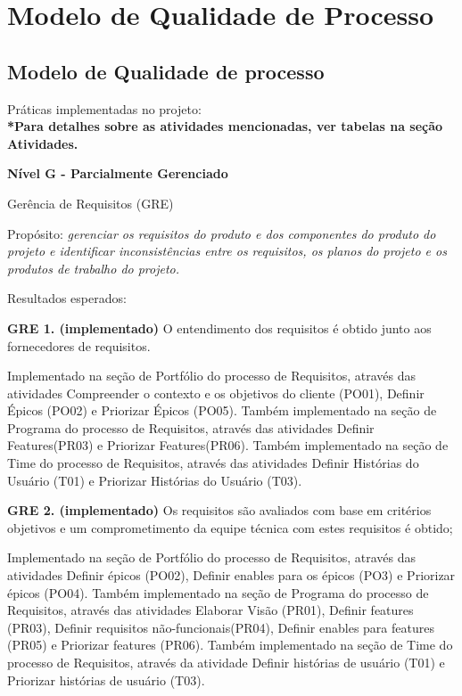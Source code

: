 \chapter[Modelo de Qualidade de Processo]{Modelo de Qualidade de Processo}
{\large {\section { Modelo de Qualidade de processo \\ } } }
{\large Práticas implementadas no projeto:\\}
{\footnotesize {\textbf { *Para detalhes sobre as atividades mencionadas, ver tabelas na seção Atividades. \\ }}}

\begin {enumerate}
{\item {\large \textbf{Nível G - Parcialmente Gerenciado \\}}}

\begin  {itemize}
{\item {Gerência de Requisitos (GRE)}}

{\tab Propósito: \textit{gerenciar os requisitos do produto e dos componentes do produto do projeto e identificar inconsistências entre os requisitos, os planos do projeto e os produtos de trabalho do projeto.\\}}

{Resultados esperados:\\}

{\item \textbf{GRE 1. (implementado)} O entendimento dos requisitos é obtido junto aos fornecedores de requisitos.}

Implementado na seção de Portfólio do processo de Requisitos, através das atividades Compreender o contexto e os objetivos do cliente (PO01), Definir Épicos (PO02) e Priorizar Épicos (PO05).
Também implementado na seção de Programa do processo de Requisitos, através das atividades Definir Features(PR03) e Priorizar Features(PR06).
Também implementado na seção de Time do processo de Requisitos, através das atividades Definir Histórias do Usuário (T01) e Priorizar Histórias do Usuário (T03).


{\item \textbf{GRE 2. (implementado)} Os requisitos são avaliados com base em critérios objetivos e um comprometimento da equipe técnica com estes requisitos é obtido;}

Implementado na seção de Portfólio do processo de Requisitos, através das atividades Definir épicos (PO02), Definir enables para os épicos (PO3) e Priorizar épicos (PO04).
Também implementado na seção de Programa do processo de Requisitos, através das atividades Elaborar Visão (PR01), Definir features (PR03), Definir requisitos não-funcionais(PR04), Definir enables para features (PR05) e Priorizar features (PR06).
Também implementado na seção de Time do processo de Requisitos, através da atividade Definir histórias de usuário (T01) e Priorizar histórias de usuário (T03).


\end{itemize}
\end{enumerate}
